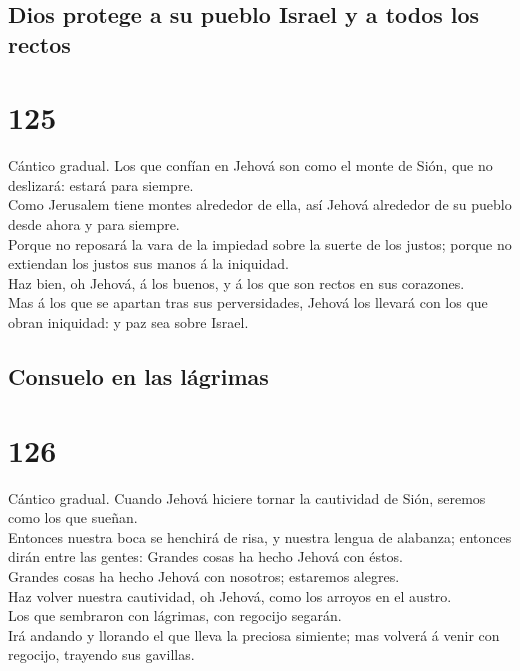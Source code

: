 \hypertarget{dios-protege-a-su-pueblo-israel-y-a-todos-los-rectos}{%
\subsection{Dios protege a su pueblo Israel y a todos los
rectos}\label{dios-protege-a-su-pueblo-israel-y-a-todos-los-rectos}}

\hypertarget{section-124}{%
\section{125}\label{section-124}}

 Cántico gradual. Los que confían en Jehová son como el
monte de Sión, que no deslizará: estará para siempre.\\
 Como Jerusalem tiene montes alrededor de ella, así Jehová
alrededor de su pueblo desde ahora y para siempre.\\
 Porque no reposará la vara de la impiedad sobre la suerte
de los justos; porque no extiendan los justos sus manos á la
iniquidad.\\
 Haz bien, oh Jehová, á los buenos, y á los que son rectos
en sus corazones.\\
 Mas á los que se apartan tras sus perversidades, Jehová
los llevará con los que obran iniquidad: y paz sea sobre Israel.

\hypertarget{consuelo-en-las-luxe1grimas}{%
\subsection{Consuelo en las
lágrimas}\label{consuelo-en-las-luxe1grimas}}

\hypertarget{section-125}{%
\section{126}\label{section-125}}

 Cántico gradual. Cuando Jehová hiciere tornar la
cautividad de Sión, seremos como los que sueñan.\\
 Entonces nuestra boca se henchirá de risa, y nuestra
lengua de alabanza; entonces dirán entre las gentes: Grandes cosas ha
hecho Jehová con éstos.\\
 Grandes cosas ha hecho Jehová con nosotros; estaremos
alegres.\\
 Haz volver nuestra cautividad, oh Jehová, como los
arroyos en el austro.\\
 Los que sembraron con lágrimas, con regocijo segarán.\\
 Irá andando y llorando el que lleva la preciosa simiente;
mas volverá á venir con regocijo, trayendo sus gavillas.


